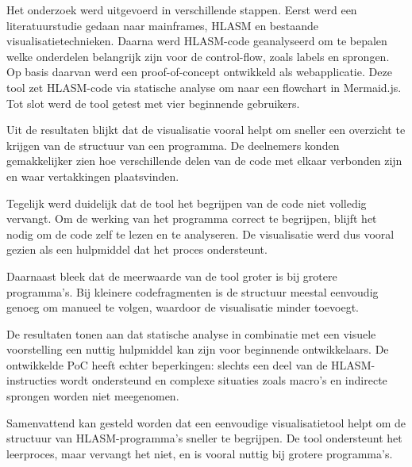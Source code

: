 Het onderzoek werd uitgevoerd in verschillende stappen. Eerst werd een literatuurstudie gedaan naar mainframes, HLASM en bestaande visualisatietechnieken. Daarna werd HLASM-code geanalyseerd om te bepalen welke onderdelen belangrijk zijn voor de control-flow, zoals labels en sprongen. Op basis daarvan werd een proof-of-concept ontwikkeld als webapplicatie. Deze tool zet HLASM-code via statische analyse om naar een flowchart in Mermaid.js. Tot slot werd de tool getest met vier beginnende gebruikers.

Uit de resultaten blijkt dat de visualisatie vooral helpt om sneller een overzicht te krijgen van de structuur van een programma. De deelnemers konden gemakkelijker zien hoe verschillende delen van de code met elkaar verbonden zijn en waar vertakkingen plaatsvinden.

Tegelijk werd duidelijk dat de tool het begrijpen van de code niet volledig vervangt. Om de werking van het programma correct te begrijpen, blijft het nodig om de code zelf te lezen en te analyseren. De visualisatie werd dus vooral gezien als een hulpmiddel dat het proces ondersteunt.

Daarnaast bleek dat de meerwaarde van de tool groter is bij grotere programma’s. Bij kleinere codefragmenten is de structuur meestal eenvoudig genoeg om manueel te volgen, waardoor de visualisatie minder toevoegt.

De resultaten tonen aan dat statische analyse in combinatie met een visuele voorstelling een nuttig hulpmiddel kan zijn voor beginnende ontwikkelaars. De ontwikkelde PoC heeft echter beperkingen: slechts een deel van de HLASM-instructies wordt ondersteund en complexe situaties zoals macro’s en indirecte sprongen worden niet meegenomen.

\newpage

Samenvattend kan gesteld worden dat een eenvoudige visualisatietool helpt om de structuur van HLASM-programma’s sneller te begrijpen. De tool ondersteunt het leerproces, maar vervangt het niet, en is vooral nuttig bij grotere programma’s.